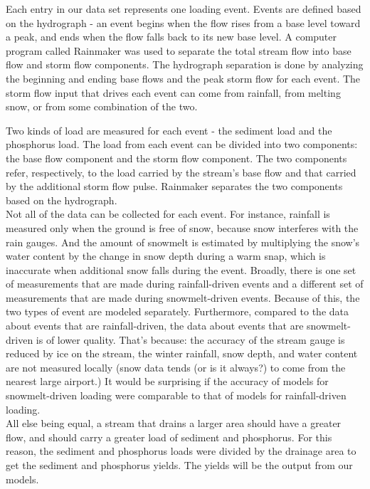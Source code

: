\documentclass[10pt]{article}
\begin{document}
Each entry in our data set represents one loading event. Events are defined based on the hydrograph - an event begins when the flow rises from a base level toward a peak, and ends when the flow falls back to its new base level. A computer program called Rainmaker was used to separate the total stream flow into base flow and storm flow components. The hydrograph separation is done by analyzing the beginning and ending base flows and the peak storm flow for each event. The storm flow input that drives each event can come from rainfall, from melting snow, or from some combination of the two.

Two kinds of load are measured for each event - the sediment load and the phosphorus load. The load from each event can be divided into two components: the base flow component and the storm flow component. The two components refer, respectively, to the load carried by the stream's base flow and that carried by the additional storm flow pulse. Rainmaker separates the two components based on the hydrograph.\\

Not all of the data can be collected for each event. For instance, rainfall is measured only when the ground is free of snow, because snow interferes with the rain gauges. And the amount of snowmelt is estimated by multiplying the snow's water content by the change in snow depth during a warm snap, which is inaccurate when additional snow falls during the event. Broadly, there is one set of measurements that are made during rainfall-driven events and a different set of measurements that are made during snowmelt-driven events. Because of this, the two types of event are modeled separately. Furthermore, compared to the data about events that are rainfall-driven, the data about events that are snowmelt-driven is of lower quality. That's because: the accuracy of the stream gauge is reduced by ice on the stream, the winter rainfall, snow depth, and water content are not measured locally (snow data tends (or is it always?) to come from the nearest large airport.) It would be surprising if the accuracy of models for snowmelt-driven loading were comparable to that of models for rainfall-driven loading.\\

All else being equal, a stream that drains a larger area should have a greater flow, and should carry a greater load of sediment and phosphorus. For this reason, the sediment and phosphorus loads were divided by the drainage area to get the sediment and phosphorus yields. The yields will be the output from our models.\\
\end{document}
